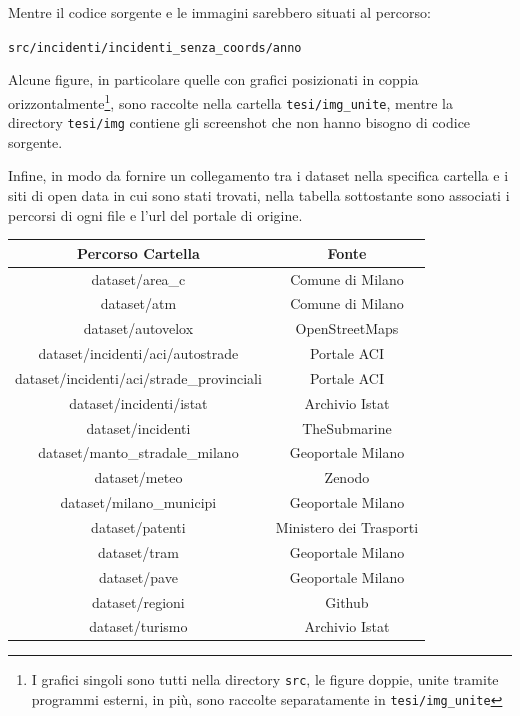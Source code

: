 \documentclass[a4paper]{report}
\newcommand{\filenamestyle}[1]{\texttt{#1}}
\newcommand{\skipline}{\vspace{0.2in}}
\begin{document}
\skipline
\noindent Mentre il codice sorgente e le immagini sarebbero situati al percorso:

\skipline
\indent\filenamestyle{src/incidenti/incidenti\_senza\_coords/anno}

\skipline
Alcune figure, in particolare quelle con grafici posizionati in coppia 
orizzontalmente\footnote{I grafici singoli sono tutti nella directory \filenamestyle{src}, 
le figure doppie, unite tramite programmi esterni, in più, sono raccolte separatamente 
in \filenamestyle{tesi/img\_unite}}, 
sono raccolte nella cartella \filenamestyle{tesi/img\_unite}, 
mentre la directory \filenamestyle{tesi/img} contiene gli screenshot 
che non hanno bisogno di codice sorgente. 

Infine, in modo da fornire un collegamento tra i dataset nella specifica cartella e i siti 
di open data in cui sono stati trovati, nella tabella sottostante sono associati i percorsi di 
ogni file e l'url del portale di origine. 

\begin{center}
    \def\arraystretch{1.5}%
    \begin{tabular}{ |c|c| } 
    \hline
    Percorso Cartella & Fonte \\ 
    \hline
    \rowcolor{TableGray}
    dataset/area\_c & Comune di Milano\footnotemark[1] \\
    dataset/atm & Comune di Milano\footnotemark[2] \\
    \rowcolor{TableGray}
    dataset/autovelox & OpenStreetMaps\footnotemark[3] \\
    dataset/incidenti/aci/autostrade & Portale ACI\footnotemark[4] \\
    \rowcolor{TableGray}
    dataset/incidenti/aci/strade\_provinciali & Portale ACI\footnotemark[5] \\
    dataset/incidenti/istat & Archivio Istat\footnotemark[5]\\
    \rowcolor{TableGray}
    dataset/incidenti & TheSubmarine\footnotemark[7]\\
    dataset/manto\_stradale\_milano & Geoportale Milano\footnotemark[8]\\
    \rowcolor{TableGray}
    dataset/meteo & Zenodo\footnotemark[9]\\
    dataset/milano\_municipi & Geoportale Milano\footnotemark[10]\\
    \rowcolor{TableGray}
    dataset/patenti & Ministero dei Trasporti\footnotemark[11]\\
    dataset/tram & Geoportale Milano\footnotemark[12]\\
    \rowcolor{TableGray}
    dataset/pave & Geoportale Milano\footnotemark[12]\\
    dataset/regioni & Github\footnotemark[13]\\
    \rowcolor{TableGray}
    dataset/turismo & Archivio Istat\footnotemark[14]\\
    \hline
    \end{tabular}
\end{center}
\end{document}
